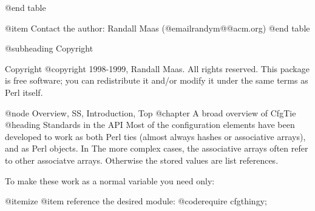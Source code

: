 @end table

@item Contact the author:
Randall Maas (@email{randym@@acm.org})
@end table

@subheading Copyright

Copyright @copyright{} 1998-1999, Randall Maas. All rights reserved.  This
package is free software; you can redistribute it and/or modify it
under the same terms as Perl itself.

@node Overview, SS, Introduction, Top
@chapter A broad overview of CfgTie
@heading Standards in the API
Most of the configuration elements have been developed to work as both Perl
ties (almost always hashes or associative arrays), and as Perl objects.  In
The more complex cases, the associative arrays often refer to other associatve
arrays.  Otherwise the stored values are list references.

To make these work as a normal variable you need only:

@itemize
@item reference the desired module:
@code{require cfgthingy;}

